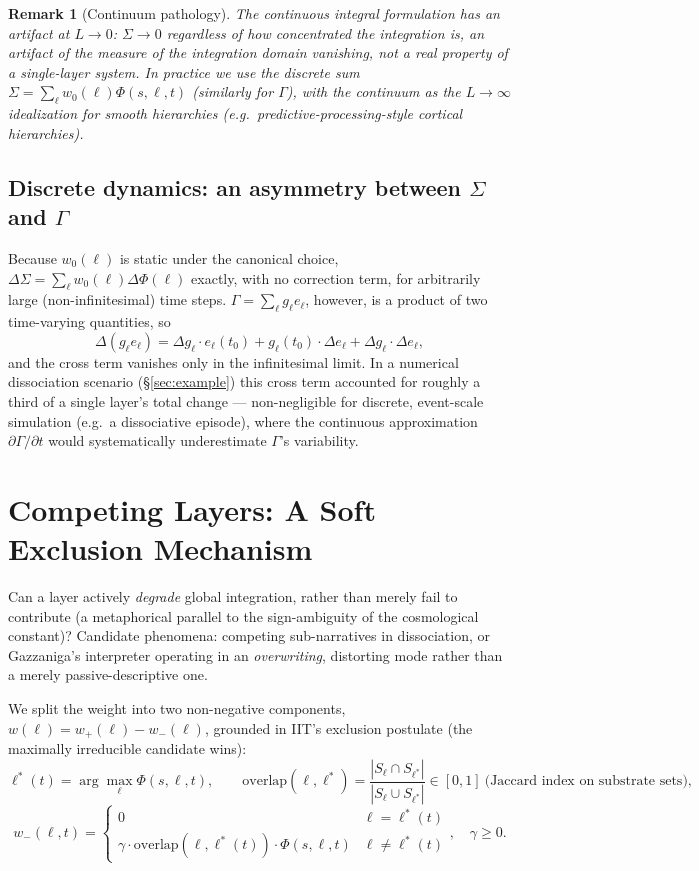 \documentclass[11pt]{article}
\newtheorem*{remark}{Remark}
\begin{document}
\begin{remark}[Continuum pathology]\label{sec:pathology}
The continuous integral formulation has an artifact at $L\to0$: $\Sigma\to0$ regardless of how concentrated the integration is, an artifact of the measure of the integration domain vanishing, not a real property of a single-layer system. In practice we use the discrete sum $\Sigma=\sum_\ell w_0(\ell)\Phi(s,\ell,t)$ (similarly for $\Gamma$), with the continuum as the $L\to\infty$ idealization for smooth hierarchies (e.g.\ predictive-processing-style cortical hierarchies).
\end{remark}

\subsection{Discrete dynamics: an asymmetry between $\Sigma$ and $\Gamma$}
Because $w_0(\ell)$ is static under the canonical choice, $\Delta\Sigma=\sum_\ell w_0(\ell)\Delta\Phi(\ell)$ exactly, with no correction term, for arbitrarily large (non-infinitesimal) time steps. $\Gamma=\sum_\ell g_\ell e_\ell$, however, is a product of two time-varying quantities, so
\[
\Delta(g_\ell e_\ell) = \Delta g_\ell\cdot e_\ell(t_0) + g_\ell(t_0)\cdot\Delta e_\ell + \Delta g_\ell\cdot\Delta e_\ell,
\]
and the cross term vanishes only in the infinitesimal limit. In a numerical dissociation scenario (\S\ref{sec:example}) this cross term accounted for roughly a third of a single layer's total change --- non-negligible for discrete, event-scale simulation (e.g.\ a dissociative episode), where the continuous approximation $\partial\Gamma/\partial t$ would systematically underestimate $\Gamma$'s variability.

\section{Competing Layers: A Soft Exclusion Mechanism}\label{sec:exclusion}

Can a layer actively \emph{degrade} global integration, rather than merely fail to contribute (a metaphorical parallel to the sign-ambiguity of the cosmological constant)? Candidate phenomena: competing sub-narratives in dissociation, or Gazzaniga's interpreter operating in an \emph{overwriting}, distorting mode rather than a merely passive-descriptive one.

We split the weight into two non-negative components, $w(\ell)=w_+(\ell)-w_-(\ell)$, grounded in IIT's exclusion postulate (the maximally irreducible candidate wins):
\[
\ell^*(t) = \arg\max_\ell \Phi(s,\ell,t), \qquad \text{overlap}(\ell,\ell^*) = \frac{|S_\ell\cap S_{\ell^*}|}{|S_\ell\cup S_{\ell^*}|}\in[0,1]\ \text{(Jaccard index on substrate sets)},
\]
\[
w_-(\ell,t) = \begin{cases} 0 & \ell=\ell^*(t) \\ \gamma\cdot\text{overlap}(\ell,\ell^*(t))\cdot\Phi(s,\ell,t) & \ell\neq\ell^*(t)\end{cases}, \quad \gamma\ge0.
\]
\end{document}
